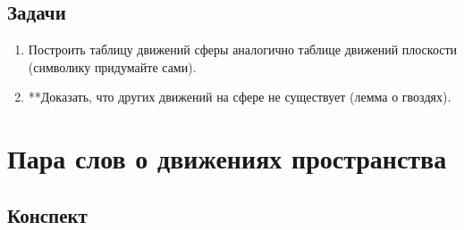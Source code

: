 \subsection{Задачи}
\begin{enumerate}
\item Построить таблицу движений сферы аналогично таблице движений плоскости (символику придумайте сами).
\item **Доказать, что других движений на сфере не существует (лемма о гвоздях).
\end{enumerate}


\section{Пара слов о движениях пространства}
\subsection{Конспект}
